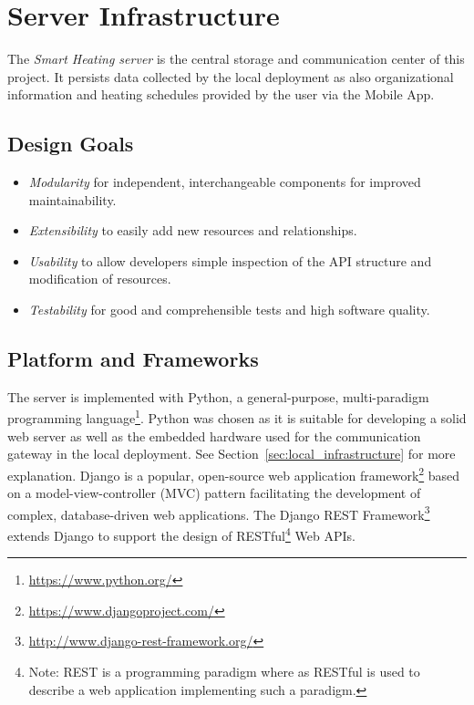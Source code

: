 
\section{Server Infrastructure}
\label{sec:server_infrastructure}

The \emph{Smart Heating server} is the central storage and communication center of this project.
It persists data collected by the local deployment as also organizational information and heating schedules provided by the user via the Mobile App.

\subsection{Design Goals}
\label{sec:server_infrastructure_design_goals}

\begin{itemize}
\item \emph{Modularity} for independent, interchangeable components for improved maintainability.
\item \emph{Extensibility} to easily add new resources and relationships.
\item \emph{Usability} to allow developers simple inspection of the API structure and modification of resources.
\item \emph{Testability} for good and comprehensible tests and high software quality.
\end{itemize}

\subsection{Platform and Frameworks}
\label{sec:server_infrastructure_platform_and_frameworks}

The server is implemented with Python, a general-purpose, multi-paradigm programming language\footnote{\url{https://www.python.org/}}.
Python was chosen as it is suitable for developing a solid web server as well as the embedded hardware used for the communication gateway in the local deployment. See Section~\ref{sec:local_infrastructure} for more explanation.
Django is a popular, open-source web application framework\footnote{\url{https://www.djangoproject.com/}} based on a model-view-controller (MVC) pattern facilitating the development of complex, database-driven web applications.
The Django REST Framework\footnote{\url{http://www.django-rest-framework.org/}} extends Django to support the design of RESTful\footnote{Note: REST is a programming paradigm where as RESTful is used to describe a web application implementing such a paradigm.} Web APIs.

